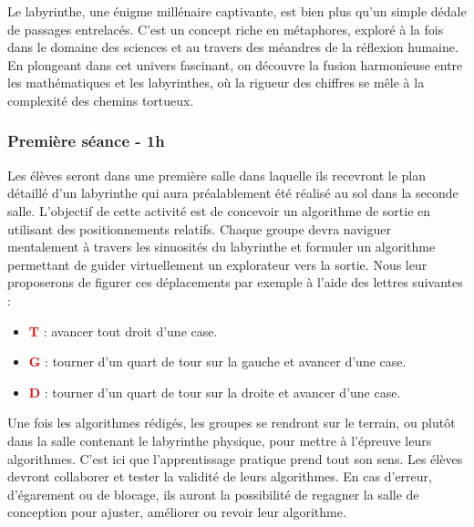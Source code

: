 Le labyrinthe, une énigme millénaire captivante, est bien plus qu'un simple dédale de passages entrelacés.
C'est un concept riche en métaphores, exploré à la fois dans le domaine des sciences et au travers des méandres de la réflexion humaine.
En plongeant dans cet univers fascinant, on découvre la fusion harmonieuse entre les mathématiques et les labyrinthes, où la rigueur
des chiffres se mêle à la complexité des chemins tortueux.
\subsubsection*{Première séance - 1h}

Les élèves seront dans une première salle dans laquelle ils recevront le plan détaillé d'un labyrinthe qui aura préalablement été réalisé au sol dans la seconde salle.
L'objectif de cette activité est de concevoir un algorithme de sortie en utilisant des positionnements relatifs.
Chaque groupe devra naviguer mentalement à travers les sinuosités du labyrinthe et formuler un algorithme permettant de guider virtuellement un explorateur vers la sortie.
Nous leur proposerons de figurer ces déplacements par exemple à l'aide des lettres suivantes :
\begin{itemize}
    \item \textbf{\textcolor{red}{T}} : avancer tout droit d'une case.
    \item \textbf{\textcolor{red}{G}} : tourner d'un quart de tour sur la gauche et avancer d'une case.
    \item \textbf{\textcolor{red}{D}} : tourner d'un quart de tour sur la droite et avancer d'une case.
\end{itemize}

Une fois les algorithmes rédigés, les groupes se rendront sur le terrain, ou plutôt dans la salle contenant le labyrinthe physique,
pour mettre à l'épreuve leurs algorithmes. C'est ici que l'apprentissage pratique prend tout son sens. Les élèves devront collaborer
et tester la validité de leurs algorithmes. En cas d'erreur, d'égarement ou de blocage, ils auront la possibilité de regagner la salle
de conception pour ajuster, améliorer ou revoir leur algorithme.

